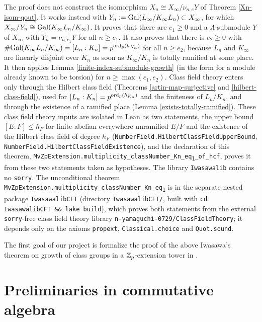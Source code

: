 \begin{remark}
The {\Lean} proof does not construct the isomorphism $X_n\cong
X_\infty/\nu_{n,e}Y$ of Theorem \ref{Xn-isom-qout}. It works instead with
$Y_n:={\mathrm{Gal}}(L_\infty/K_\infty L_n)\subset X_\infty$, for which
$X_\infty/Y_n\cong{\mathrm{Gal}}(K_\infty L_n/K_\infty)$. It proves that there are
$e_1\geq 0$ and a $\Lambda$-submodule $Y$ of $X_\infty$ with $Y_n=\nu_{n,e_1}Y$
for all $n\geq e_1$. It also proves that there is $e_2\geq 0$ with
$\#{\mathrm{Gal}}(K_\infty L_n/K_\infty)=[L_n:K_n]=p^{\operatorname{ord}_p(h_{K_n})}$ for all $n\geq
e_2$, because $L_n$ and $K_\infty$ are linearly disjoint over $K_n$ as soon as
$K_\infty/K_n$ is totally ramified at some place. It then applies Lemma
\ref{finite-index-submodule-growth} (in the form for a module already known to be torsion) for
$n\geq\max(e_1,e_2)$. Class field theory
enters only through the Hilbert class field (Theorems \ref{artin-map-surjective}
and \ref{hilbert-class-field}), used for
$[L_n:K_n]=p^{\operatorname{ord}_p(h_{K_n})}$ and the finiteness of $L_n/K_n$, and through the
existence of a ramified place (Lemma \ref{exists-totally-ramified}).
These class field theory inputs are isolated in Lean as two statements, the
upper bound $[E:F]\leq h_F$ for finite abelian everywhere unramified $E/F$ and
the existence of the Hilbert class field of degree $h_F$
(\texttt{NumberField.HilbertClassFieldUpperBound},
\texttt{NumberField.HilbertClassFieldExistence}), and the {\Lean} declaration
of this theorem,
\texttt{MvZpExtension.multiplicity\_classNumber\_Kn\_eq\textsubscript{1}\_of\_hcf},
proves it from these two statements taken as hypotheses.
The library \texttt{Iwasawalib} contains no \texttt{sorry}.
The unconditional theorem
\texttt{MvZpExtension.multiplicity\_classNumber\_Kn\_eq\textsubscript{1}} is in the
separate nested package \texttt{IwasawalibCFT} (directory \texttt{IwasawalibCFT/},
built with \texttt{cd IwasawalibCFT \&\& lake build}), which proves both
statements from the external \texttt{sorry}-free class field theory library
\texttt{n-yamaguchi-0729/ClassFieldTheory}; it depends only on the axioms
\texttt{propext}, \texttt{Classical.choice} and \texttt{Quot.sound}.
\end{remark}

The first goal of our project is formalize the proof of the above
Iwasawa's theorem on growth of class groups in a ${\mathbb {Z}}_p$-extension tower
in {\Lean}.

\section{Preliminaries in commutative algebra}

